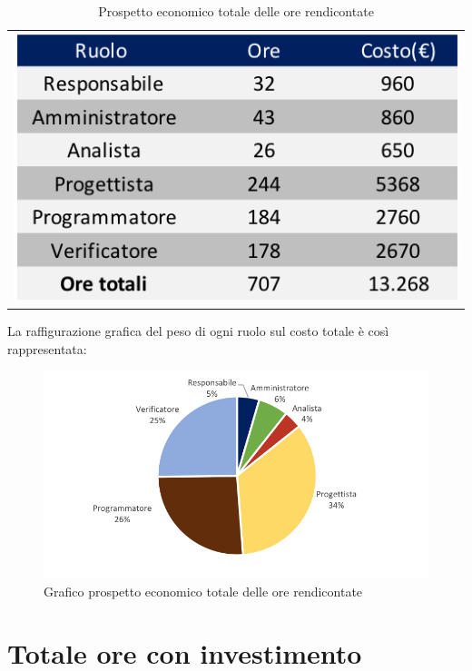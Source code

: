 \begin{table}[!ht]
	\begin{center}
		\begin{tabular}{c}
			\includegraphics{images/tabellaOreRendicontateEuro.png}
		\end{tabular}
		\caption{Prospetto economico totale delle ore rendicontate}
	\end{center}
\end{table}

La raffigurazione grafica del peso di ogni ruolo sul costo totale è così rappresentata:

\begin{figure}[!ht]
	\begin{center}
		\includegraphics[scale=0.90]{images/grafoOreRendicontateEuro.png}
		\caption{Grafico prospetto economico totale delle ore rendicontate}
	\end{center}
\end{figure}

\section{Totale ore con investimento}
